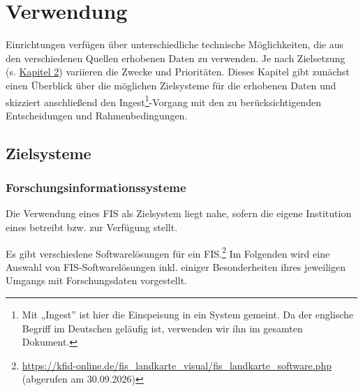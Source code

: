 \documentclass[
  ngerman,
  letterpaper,
  DIV=11]{scrreprt}
\begin{document}
\chapter{Verwendung}\label{verwendung}

Einrichtungen verfügen über unterschiedliche technische Möglichkeiten,
die aus den verschiedenen Quellen erhobenen Daten zu verwenden. Je nach
Zielsetzung (s. \hyperref[voruxfcberlegungen]{Kapitel 2}) variieren die
Zwecke und Prioritäten. Dieses Kapitel gibt zunächst einen Überblick
über die möglichen Zielsysteme für die erhobenen Daten und skizziert
anschließend den Ingest\footnote{Mit „Ingest'' ist hier die Einspeisung
  in ein System gemeint. Da der englische Begriff im Deutschen geläufig
  ist, verwenden wir ihn im gesamten Dokument.}-Vorgang mit den zu
berücksichtigenden Entscheidungen und Rahmenbedingungen.

\section{Zielsysteme}\label{zielsysteme}

\subsection{Forschungsinformationssysteme}\label{forschungsinformationssysteme}

Die Verwendung eines FIS als Zielsystem liegt nahe, sofern die eigene
Institution eines betreibt bzw. zur Verfügung stellt.

Es gibt verschiedene Softwarelösungen für ein FIS.\footnote{\url{https://kfid-online.de/fis_landkarte_visual/fis_landkarte_software.php}
  (abgerufen am 30.09.2026)} Im Folgenden wird eine Auswahl von
FIS-Softwarelösungen inkl. einiger Besonderheiten ihres jeweiligen
Umgangs mit Forschungsdaten vorgestellt.
\end{document}
